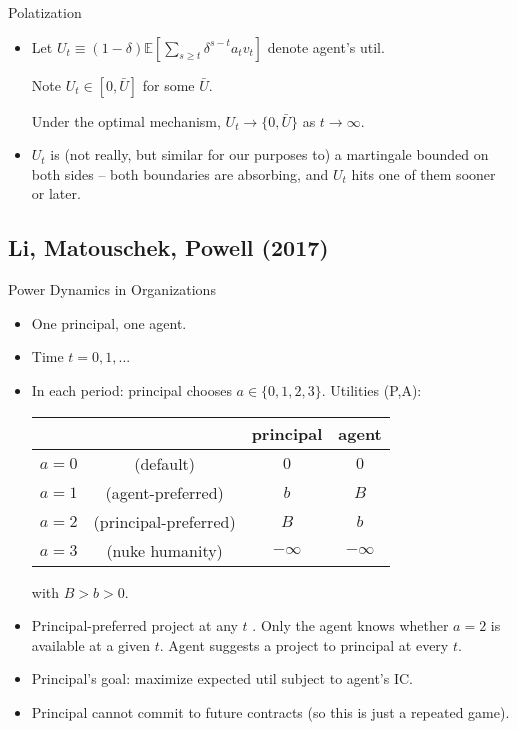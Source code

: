 \documentclass[english,10pt
,aspectratio=169
]{beamer}
\begin{document}
\begin{frame}{Polatization}
\begin{itemize}
	\item Let $U_t \equiv (1-\delta) \mathbb{E} \left[\sum_{s \geq t} \delta^{s-t} a_t v_t\right]$ denote agent's util. 
	
	Note $U_t \in \left[0,\bar{U}\right]$ for some $\bar{U}$.
	
	\begin{theorem}[Polarisation]
		Under the optimal mechanism, $U_t \to \{0, \bar{U}\}$ as $t \to \infty$.
	\end{theorem}
	
	\item $U_t$ is (not really, but similar for our purposes to) a martingale bounded on both sides -- both boundaries are absorbing, and $U_t$ hits one of them sooner or later.
\end{itemize}
\end{frame}


\subsection{Li, Matouschek, Powell (2017)}

\begin{frame}{Power Dynamics in Organizations \citep{li_power_2017}}
\begin{itemize}
	\item One principal, one agent.
	\item Time $t=0,1,...$
	\item In each period: principal chooses $a \in \{0,1,2,3\}$. Utilities (P,A):
	\medskip
	\begin{center}
		\begin{tabular}{c c | c | c |}
			& & principal 	& agent \\ \hline
			$a=0$ & (default)	& $0$ 	& $0$	\\ \hline
			$a=1$ & (agent-preferred)	& $b$ 	& $B$	\\ \hline
			$a=2$ & (principal-preferred)	& $B$ 	& $b$	\\ \hline
			$a=3$ & (nuke humanity)	& $-\infty$	& $-\infty$ \\ \hline
		\end{tabular}
	\end{center}
	\medskip
	with $B > b > 0$.
	\item Principal-preferred project  at any $t$ . Only the agent knows whether $a=2$ is available at a given $t$. Agent suggests a project to principal at every $t$.
	\item Principal's goal: maximize expected util subject to agent's IC.
	\item Principal \alert{cannot commit} to future contracts (so this is just a repeated game).
\end{itemize}
\end{frame}
\end{document}
